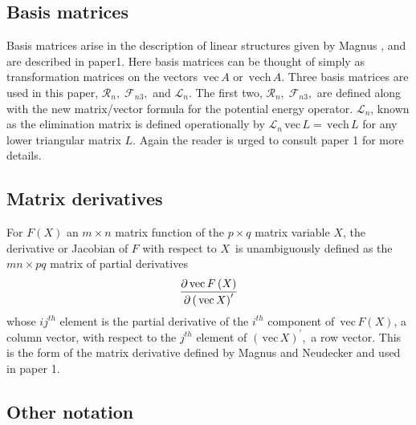 \documentclass[12pt,thmsa]{article}
\begin{document}
\subsection{Basis matrices}

Basis matrices arise in the description of linear structures given by Magnus%
\cite{Magnus88}, and are described in paper1. Here basis matrices can be
thought of simply as transformation matrices on the vectors $\,\mathrm{vec}%
\,A$ or $\,\mathrm{vech}\,A$. Three basis matrices are used in this paper, $%
\mathcal{R}_n,\;\mathcal{F}_{n3},$ and $\mathcal{L}_n$. The first two, $%
\mathcal{R}_n,\;\mathcal{F}_{n3},$ are defined along with the new
matrix/vector formula for the potential energy operator. $\mathcal{L}_n$,
known as the elimination matrix is defined operationally by $\mathcal{L}_n\,%
\mathrm{vec}\,L=\,\mathrm{vech}\,L$ for any lower triangular matrix $L.$
Again the reader is urged to consult paper 1 for more details.

\subsection{Matrix derivatives}

For $F\left( X\right) $ an $m\times n$ matrix function of the $p\times q$
matrix variable $X$, the derivative or Jacobian of $F$ with respect to $X\,$
is unambiguously defined as the $mn\times pq$ matrix of partial derivatives 
\begin{equation}
\frac{\partial \,\mathrm{vec}\,F\left( X\right) }{\partial \left( \,\mathrm{%
vec}\,X\right) ^{\prime }}  \label{derdef}
\end{equation}
whose $ij^{th}$ element is the partial derivative of the $i^{th}$ component
of $\,\mathrm{vec}\,F\left( X\right) $, a column vector, with respect to the 
$j^{th}$ element of $\left( \,\mathrm{vec}\,X\right) ^{\prime },$ a row
vector. This is the form of the matrix derivative defined by Magnus and
Neudecker\cite{MagNeud88} and used in paper 1.

\subsection{Other notation}
\end{document}
